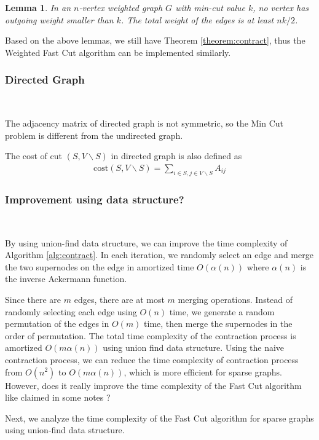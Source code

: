 \documentclass[11pt]{article}
\theoremstyle{plain}
\newtheorem{lemma}{Lemma}[section]
\begin{document}
\begin{lemma}
    In an $n$-vertex weighted graph $G$ with min-cut value $k$, no vertex has outgoing weight smaller than $k$. The total weight of the edges is at least $nk/2$.
\end{lemma}

Based on the above lemmas, we still have Theorem \ref{theorem:contract}, thus the Weighted Fast Cut algorithm can be implemented similarly.

\subsubsection{Directed Graph}\

The adjacency matrix of directed graph is not symmetric, so the Min Cut problem is different from the undirected graph.

The cost of cut $(S,V\backslash S)$ in directed graph is also defined as
\begin{align*}
    \text{cost}(S,V\backslash S)=\sum_{i\in S, j\in V\backslash S}A_{ij}
\end{align*}

\subsubsection{Improvement using data structure?}\

By using union-find data structure, we can improve the time complexity of Algorithm \ref{alg:contract}. In each iteration, we randomly select an edge and merge the two supernodes on the edge in amortized time $O(\alpha(n))$ where $\alpha(n)$ is the inverse Ackermann function. 

Since there are $m$ edges,  there are at most $m$ merging operations. Instead of randomly selecting each edge using $O(n)$ time, we generate a random permutation of the edges in $O(m)$ time, then merge the supernodes in the order of permutation. The total time complexity of the contraction process is amortized $O(m\alpha(n))$ using union find data structure. Using the naive contraction process, we can reduce the time complexity of contraction process from $O(n^2)$ to $O(m\alpha(n))$, which is more efficient for sparse graphs. However, does it really improve the time complexity of the Fast Cut algorithm like claimed in some notes\cite{CS161Lecture16} ?

Next, we analyze the time complexity of the Fast Cut algorithm for sparse graphs using union-find data structure.
\end{document}
